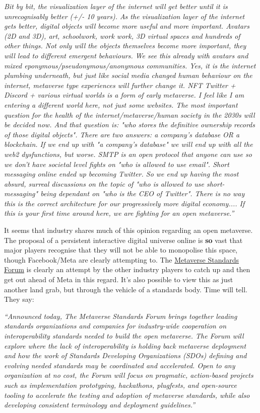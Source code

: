 \textit{Bit by bit, the visualization layer of the internet will get better until it is unrecognisably better (+/- 10 years). As the visualization layer of the internet gets better, digital objects will become more useful and more important. Avatars (2D and 3D), art, schoolwork, work work, 3D virtual spaces and hundreds of other things. Not only will the objects themselves become more important, they will lead to different emergent behaviours. We see this already with avatars and mixed eponymous/pseudonymous/anonymous communities. Yes, it is the internet plumbing underneath, but just like social media changed human behaviour on the internet, metaverse type experiences will further change it. NFT Twitter + Discord + various virtual worlds is a form of early metaverse. I feel like I am entering a different world here, not just some websites. The most important question for the health of the internet/metaverse/human society in the 2030s will be decided now. And that question is: "who stores the definitive ownership records of those digital objects". There are two answers: a company's database OR a blockchain. If we end up with "a company's database" we will end up with all the web2 dysfunctions, but worse. SMTP is an open protocol that anyone can use so we don't have societal level fights on "who is allowed to use email". Short messaging online ended up becoming Twitter. So we end up having the most absurd, surreal discussions on the topic of "who is allowed to use short-messaging" being dependant on "who is the CEO of Twitter". There is no way this is the correct architecture for our progressively more digital economy.... If this is your first time around here, we are fighting for an open metaverse.''}\par
It seems that industry shares much of this opinion regarding an open metaverse. The proposal of a persistent interactive digital universe online is \textbf{so} vast that major players recognise that they will not be able to monopolise this space, though Facebook/Meta are clearly attempting to. The \href{https://metaverse-standards.org/news/press-releases/leading-standards-organizations-and-companies-unite-to-drive-open-metaverse-interoperability/}{Metaverse Standards Forum} is clearly an attempt by the other industry players to catch up and then get out ahead of Meta in this regard. It's also possible to view this as just another land grab, but through the vehicle of a standards body. Time will tell. They say:\par
\textit{``Announced today, The Metaverse Standards Forum brings together leading standards organizations and companies for industry-wide cooperation on interoperability standards needed to build the open metaverse. The Forum will explore where the lack of interoperability is holding back metaverse deployment and how the work of Standards Developing Organizations (SDOs) defining and evolving needed standards may be coordinated and accelerated. Open to any organization at no cost, the Forum will focus on pragmatic, action-based projects such as implementation prototyping, hackathons, plugfests, and open-source tooling to accelerate the testing and adoption of metaverse standards, while also developing consistent terminology and deployment guidelines.''}\par
